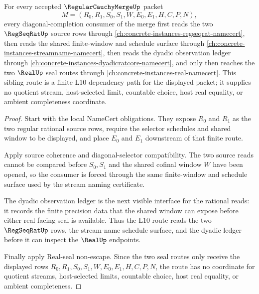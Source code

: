 \begin{theorem}
\label{thm:regular-cauchy-merge-l10-sibling-route}
For every accepted $\RegularCauchyMergeUp$ packet
$$
M=(R_0,R_1,S_0,S_1,W,E_0,E_1,H,C,P,N),
$$
every diagonal-completion consumer of the merge first reads the two $\RegSeqRatUp$ source rows through \autoref{ch:concrete-instances-regseqrat-namecert}, then reads the shared finite-window and schedule surface through \autoref{ch:concrete-instances-streamname-namecert}, then reads the dyadic observation ledger through \autoref{ch:concrete-instances-dyadicratcore-namecert}, and only then reaches the two $\RealUp$ seal routes through \autoref{ch:concrete-instances-real-namecert}. This sibling route is a finite L10 dependency path for the displayed packet; it supplies no quotient stream, host-selected limit, countable choice, host real equality, or ambient completeness coordinate.
\end{theorem}
\begin{proof}
Start with the local NameCert obligations. They expose $R_0$ and $R_1$ as the two regular rational source rows, require the selector schedules and shared window to be displayed, and place $E_0$ and $E_1$ downstream of that finite route.

Apply source coherence and diagonal-selector compatibility. The two source reads cannot be compared before $S_0,S_1$ and the shared cofinal window $W$ have been opened, so the consumer is forced through the same finite-window and schedule surface used by the stream naming certificate.

The dyadic observation ledger is the next visible interface for the rational reads: it records the finite precision data that the shared window can expose before either real-facing seal is available. Thus the L10 route reads the two $\RegSeqRatUp$ rows, the stream-name schedule surface, and the dyadic ledger before it can inspect the $\RealUp$ endpoints.

Finally apply Real-seal non-escape. Since the two seal routes only receive the displayed rows $R_0,R_1,S_0,S_1,W,E_0,E_1,H,C,P,N$, the route has no coordinate for quotient streams, host-selected limits, countable choice, host real equality, or ambient completeness.
\end{proof}


